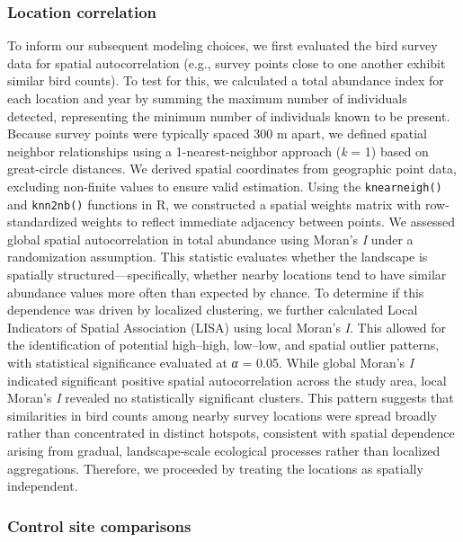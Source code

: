 \documentclass[
  letterpaper,
  DIV=11,
  numbers=noendperiod]{scrartcl}
\begin{document}
\subsubsection{Location correlation}\label{sec-location-correction}

To inform our subsequent modeling choices, we first evaluated the bird
survey data for spatial autocorrelation (e.g., survey points close to
one another exhibit similar bird counts). To test for this, we
calculated a total abundance index for each location and year by summing
the maximum number of individuals detected, representing the minimum
number of individuals known to be present. Because survey points were
typically spaced 300 m apart, we defined spatial neighbor relationships
using a 1-nearest-neighbor approach (\emph{k} = 1) based on great-circle
distances. We derived spatial coordinates from geographic point data,
excluding non-finite values to ensure valid estimation. Using the
\texttt{knearneigh()} and \texttt{knn2nb()} functions in R, we
constructed a spatial weights matrix with row-standardized weights to
reflect immediate adjacency between points. We assessed global spatial
autocorrelation in total abundance using Moran's \emph{I} under a
randomization assumption. This statistic evaluates whether the landscape
is spatially structured---specifically, whether nearby locations tend to
have similar abundance values more often than expected by chance. To
determine if this dependence was driven by localized clustering, we
further calculated Local Indicators of Spatial Association (LISA) using
local Moran's \emph{I}. This allowed for the identification of potential
high--high, low--low, and spatial outlier patterns, with statistical
significance evaluated at \emph{α} = 0.05. While global Moran's \emph{I}
indicated significant positive spatial autocorrelation across the study
area, local Moran's \emph{I} revealed no statistically significant
clusters. This pattern suggests that similarities in bird counts among
nearby survey locations were spread broadly rather than concentrated in
distinct hotspots, consistent with spatial dependence arising from
gradual, landscape‑scale ecological processes rather than localized
aggregations. Therefore, we proceeded by treating the locations as
spatially independent.

\subsubsection{Control site comparisons}\label{control-site-comparisons}
\end{document}
